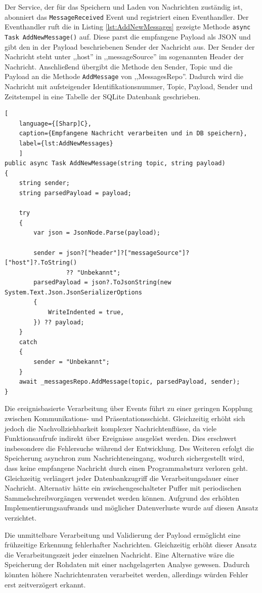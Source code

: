 Der Service, der für das Speichern und Laden von Nachrichten zuständig ist, abonniert das \lstinline|MessageReceived| Event und registriert einen Eventhandler.  Der Eventhandler ruft die in Listing \ref{lst:AddNewMessages} gezeigte Methode \lstinline|async Task AddNewMessage()| auf.
Diese parst die empfangene Payload als JSON und gibt den in der Payload beschriebenen Sender der Nachricht aus.  Der Sender der Nachricht steht unter ,,host'' in ,,messageSource'' im sogenannten Header der Nachricht. Anschließend übergibt die Methode den Sender, Topic und die Payload an die Methode \lstinline|AddMessage| von ,,MessagesRepo''.
Dadurch wird die Nachricht mit aufsteigender Identifikationsnummer, Topic, Payload, Sender und Zeitstempel in eine Tabelle der SQLite Datenbank geschrieben.
\begin{lstlisting}[
    language={[Sharp]C},
    caption={Empfangene Nachricht verarbeiten und in DB speichern},
    label={lst:AddNewMessages}
    ]
public async Task AddNewMessage(string topic, string payload)
{
    string sender;
    string parsedPayload = payload;

    try
    {
        var json = JsonNode.Parse(payload);

        sender = json?["header"]?["messageSource"]?["host"]?.ToString()
                 ?? "Unbekannt";
        parsedPayload = json?.ToJsonString(new System.Text.Json.JsonSerializerOptions
        {
            WriteIndented = true,
        }) ?? payload;
    }
    catch
    {
        sender = "Unbekannt";
    }
    await _messagesRepo.AddMessage(topic, parsedPayload, sender);
}
\end{lstlisting}

Die ereignisbasierte Verarbeitung über Events führt zu einer geringen Kopplung zwischen Kommunikations- und Präsentationsschicht. Gleichzeitig erhöht sich jedoch die Nachvollziehbarkeit komplexer Nachrichtenflüsse, da viele Funktionsaufrufe indirekt über Ereignisse ausgelöst werden. Dies erschwert insbesondere die Fehlersuche während der Entwicklung. Des Weiteren erfolgt die Speicherung asynchron zum Nachrichteneingang, wodurch sichergestellt wird, dass keine empfangene Nachricht durch einen Programmabsturz verloren geht. Gleichzeitig verlängert jeder Datenbankzugriff die Verarbeitungsdauer einer Nachricht. Alternativ hätte ein zwischengeschalteter Puffer mit periodischen Sammelschreibvorgängen verwendet werden können. Aufgrund des erhöhten Implementierungsaufwands und möglicher Datenverluste wurde auf diesen Ansatz verzichtet.

Die unmittelbare Verarbeitung und Validierung der Payload ermöglicht eine frühzeitige Erkennung fehlerhafter Nachrichten. Gleichzeitig erhöht dieser Ansatz die Verarbeitungszeit jeder einzelnen Nachricht. Eine Alternative wäre die Speicherung der Rohdaten mit einer nachgelagerten Analyse gewesen. Dadurch könnten höhere Nachrichtenraten verarbeitet werden, allerdings würden Fehler erst zeitverzögert erkannt.

